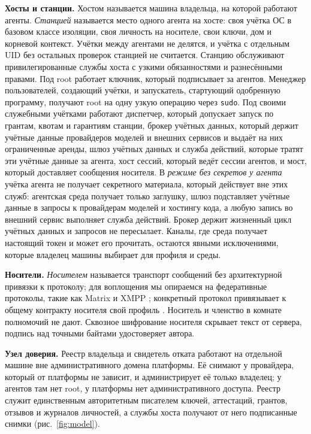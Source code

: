 \documentclass[10pt,a4paper]{article}
\begin{document}
\textbf{Хосты и станции.} Хостом называется машина владельца, на которой работают агенты. \emph{Станцией} называется место одного агента на хосте: своя учётка ОС в базовом классе изоляции, своя личность на носителе, свои ключи, дом и корневой контекст. Учётки между агентами не делятся, и учётка с отдельным UID без остальных проверок станцией не считается. Станцию обслуживают привилегированные службы хоста с узкими обязанностями и разнесёнными правами. Под root работает ключник, который подписывает за агентов. Менеджер пользователей, создающий учётки, и запускатель, стартующий одобренную программу, получают root на одну узкую операцию через \texttt{sudo}. Под своими служебными учётками работают диспетчер, который допускает запуск по грантам, квотам и гарантиям станции, брокер учётных данных, который держит учётные данные провайдеров моделей и внешних сервисов и выдаёт на них ограниченные аренды, шлюз учётных данных и служба действий, которые тратят эти учётные данные за агента, хост сессий, который ведёт сессии агентов, и мост, который доставляет сообщения носителя. В \emph{режиме без секретов у агента} учётка агента не получает секретного материала, который действует вне этих служб: агентская среда получает только заглушку, шлюз подставляет учётные данные в запросы к провайдерам моделей и хостингу кода, а любую запись во внешний сервис выполняет служба действий. Брокер держит жизненный цикл учётных данных и запросов не пересылает. Каналы, где среда получает настоящий токен и может его прочитать, остаются явными исключениями, которые владелец машины выбирает для профиля и среды.

\textbf{Носители.} \emph{Носителем} называется транспорт сообщений без архитектурной привязки к протоколу; для воплощения мы опираемся на федеративные протоколы, такие как Matrix \cite{matrix} и XMPP \cite{xmpp}; конкретный протокол привязывает к общему контракту носителя свой профиль \cite{swarmabook}. Носитель и членство в комнате полномочий не дают. Сквозное шифрование носителя скрывает текст от сервера, подпись над точными байтами удостоверяет автора.

\textbf{Узел доверия.} Реестр владельца и свидетель отката работают на отдельной машине вне административного домена платформы. Её снимают у провайдера, который от платформы не зависит, и администрирует её только владелец; у агентов там нет root, у платформы нет административного доступа. Реестр служит единственным авторитетным писателем ключей, аттестаций, грантов, отзывов и журналов личностей, а службы хоста получают от него подписанные снимки (рис.~\ref{fig:model}).
\end{document}
